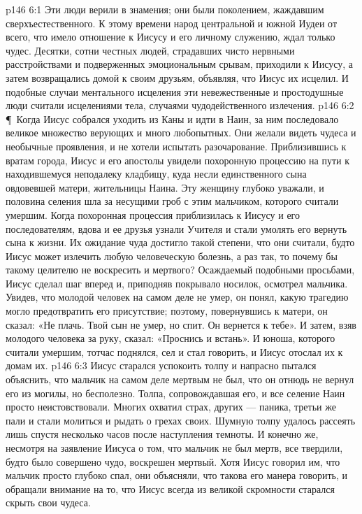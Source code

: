 \vs p146 6:1 Эти люди верили в знамения; они были поколением, жаждавшим сверхъестественного. К этому времени народ центральной и южной Иудеи от всего, что имело отношение к Иисусу и его личному служению, ждал только чудес. Десятки, сотни честных людей, страдавших чисто нервными расстройствами и подверженных эмоциональным срывам, приходили к Иисусу, а затем возвращались домой к своим друзьям, объявляя, что Иисус их исцелил. И подобные случаи ментального исцеления эти невежественные и простодушные люди считали исцелениями тела, случаями чудодейственного излечения.
\vs p146 6:2 \P\ Когда Иисус собрался уходить из Каны и идти в Наин, за ним последовало великое множество верующих и много любопытных. Они желали видеть чудеса и необычные проявления, и не хотели испытать разочарование. Приблизившись к вратам города, Иисус и его апостолы увидели похоронную процессию на пути к находившемуся неподалеку кладбищу, куда несли единственного сына овдовевшей матери, жительницы Наина. Эту женщину глубоко уважали, и половина селения шла за несущими гроб с этим мальчиком, которого считали умершим. Когда похоронная процессия приблизилась к Иисусу и его последователям, вдова и ее друзья узнали Учителя и стали умолять его вернуть сына к жизни. Их ожидание чуда достигло такой степени, что они считали, будто Иисус может излечить любую человеческую болезнь, а раз так, то почему бы такому целителю не воскресить и мертвого? Осаждаемый подобными просьбами, Иисус сделал шаг вперед и, приподняв покрывало носилок, осмотрел мальчика. Увидев, что молодой человек на самом деле не умер, он понял, какую трагедию могло предотвратить его присутствие; поэтому, повернувшись к матери, он сказал: «Не плачь. Твой сын не умер, но спит. Он вернется к тебе». И затем, взяв молодого человека за руку, сказал: «Проснись и встань». И юноша, которого считали умершим, тотчас поднялся, сел и стал говорить, и Иисус отослал их к домам их.
\vs p146 6:3 Иисус старался успокоить толпу и напрасно пытался объяснить, что мальчик на самом деле мертвым не был, что он отнюдь не вернул его из могилы, но бесполезно. Толпа, сопровождавшая его, и все селение Наин просто неистовствовали. Многих охватил страх, других --- паника, третьи же пали и стали молиться и рыдать о грехах своих. Шумную толпу удалось рассеять лишь спустя несколько часов после наступления темноты. И конечно же, несмотря на заявление Иисуса о том, что мальчик не был мертв, все твердили, будто было совершено чудо, воскрешен мертвый. Хотя Иисус говорил им, что мальчик просто глубоко спал, они объясняли, что такова его манера говорить, и обращали внимание на то, что Иисус всегда из великой скромности старался скрыть свои чудеса.
